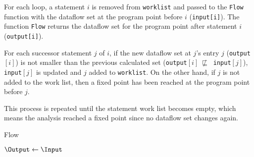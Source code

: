 For each loop, a statement $i$ is removed from
\texttt{worklist} and passed to the \texttt{Flow} function
with the dataflow set at the program point before $i$ (\texttt{input[i]}).
The function \texttt{Flow} returns the dataflow set for
the program point after statement $i$ (\texttt{output[i]}).

For each successor statement $j$ of $i$, if the new
dataflow set at $j$'s entry $j$ (\texttt{output}$[i]$)
is not smaller than the previous calculated set
(\texttt{output}$[i]\ \not\sqsubseteq\ $ \texttt{input}$[j]$),
\texttt{input}$[j]$ is updated and $j$ added to \texttt{worklist}.
On the other hand, if $j$ is not added to the work list, then
a fixed point has been reached at the program point before $j$.

This process is repeated until the statement work list
becomes empty, which means the analysis reached a
fixed point since no dataflow set changes again.

\IncMargin{1em}
\begin{algorithm}
\caption{Flow}\label{fig:algoFlow}
\SetAlgoLined
\LinesNumbered
\DontPrintSemicolon
{}


$\Output \leftarrow \Input$\;
\end{algorithm}
\DecMargin{1em}


